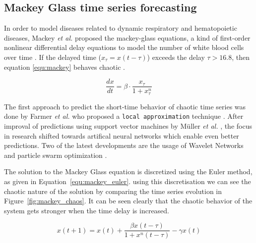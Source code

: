 \documentclass{article}
\begin{document}
\subsection{Mackey Glass time series forecasting}

In order to model diseases related to dynamic respiratory and hematopoietic
diseases, Mackey \textit{et al.} proposed the mackey-glass equations, a kind of
first-order nonlinear differential delay equations to model 
the number of white blood cells over time \cite{mackey1977}. If the
delayed time ($x_{\tau} = x(t - \tau)$) exceeds the delay $\tau > 16.8$, then
equation \ref{equ:mackey} behaves chaotic \cite{farmer1982}.

\begin{equation}
  \frac{dx}{dt} = \beta \cdot \frac{x_{\tau}}{1 + x_{\tau}^n}
  \label{equ:mackey}
\end{equation}

The first approach to predict the short-time behavior of chaotic time series
was done by Farmer \textit{et al.} who proposed a \texttt{local approximation}
technique \cite{farmer1987}. After improval of predictions using support vector
machines by Müller \textit{et al.} \cite{muller1997}, the focus in research
shifted towards artifical neural networks which enable even better predictions.
Two of the latest developments are the usage of Wavelet Networks
\cite{alexandridis2013} and particle swarm optimization \cite{caraballo2016}.

The solution to the Mackey Glass equation is discretized using the Euler method,
as given in Equation~\ref{equ:mackey_euler}. using this discretisation we can
see the chaotic nature of the solution by comparing the time series evolution 
in
Figure~\ref{fig:mackey_chaos}. It can be seen clearly that the chaotic behavior
of the system gets stronger when the time delay is increased.

\begin{equation}
  x(t+1) = x(t) + \frac{\beta x(t - \tau)}{1 + x^{n}(t - \tau)} - \gamma x(t)
  \label{equ:mackey_euler}
\end{equation}
\end{document}
